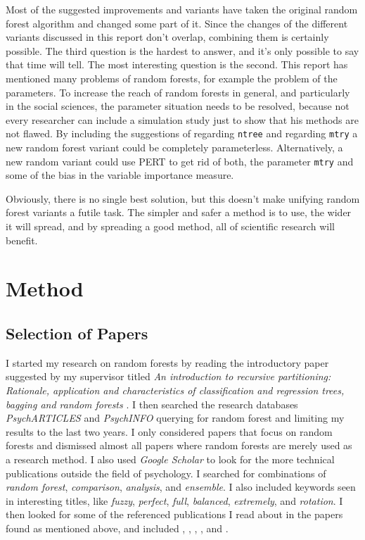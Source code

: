 \documentclass[a4paper,man,12pt,apacite,floatsintext,draftfirst]{apa6} %
\begin{document}
Most of the suggested improvements and variants have taken the original
random forest algorithm and changed some part of it. Since the changes of
the different variants discussed in this report don't overlap, combining
them is certainly possible.
The third question is the hardest to answer, and it's only possible to say
that time will tell.
The most interesting question is the second.
This report has mentioned many problems of random forests, for example the
problem of the parameters.
To increase the reach of random forests in general, and particularly in
the social sciences, the parameter situation needs to be resolved, because
not every researcher can include a simulation study just to show that his
methods are not flawed.
By including the suggestions of \cite{banfield2007comparison} regarding
\texttt{ntree} and \cite{bernard2008forest} regarding \texttt{mtry}
a new random forest variant could be completely parameterless.
Alternatively, a new random variant could use PERT to get rid of both, the
parameter \texttt{mtry} and some of the bias in the variable importance
measure.

Obviously, there is no single best solution, but this doesn't make unifying
random forest variants a futile task.
The simpler and safer a method is to use, the wider it will spread, and by
spreading a good method, all of scientific research will benefit.

\newpage
\section{Method}
\subsection{Selection of Papers}
I started my research on random forests by reading the
introductory paper suggested by my supervisor titled
\emph{An introduction to recursive partitioning: Rationale, application
and characteristics of classification and regression trees, bagging and
random forests} \cite{strobl2009introduction}.
I then searched the research databases \emph{PsychARTICLES} and
\emph{PsychINFO} querying for random forest and limiting my results
to the last two years.
I only considered papers that focus on random forests and
dismissed almost all papers where random forests are merely used as a
research method.
I also used \emph{Google Scholar} to look for the more technical
publications outside the field of psychology.
I searched for combinations of \emph{random forest}, \emph{comparison},
\emph{analysis}, and \emph{ensemble}.
I also included keywords seen in interesting titles, like \emph{fuzzy},
\emph{perfect}, \emph{full}, \emph{balanced}, \emph{extremely}, and
\emph{rotation}.
I then looked for some of the referenced publications I read about in the
papers found as mentioned above, and included \cite{strobl2008conditional},
\cite{ho1998random}, \cite{breiman1996bagging}, \cite{freund1995decision},
and \cite{long2010random}.
\end{document}
